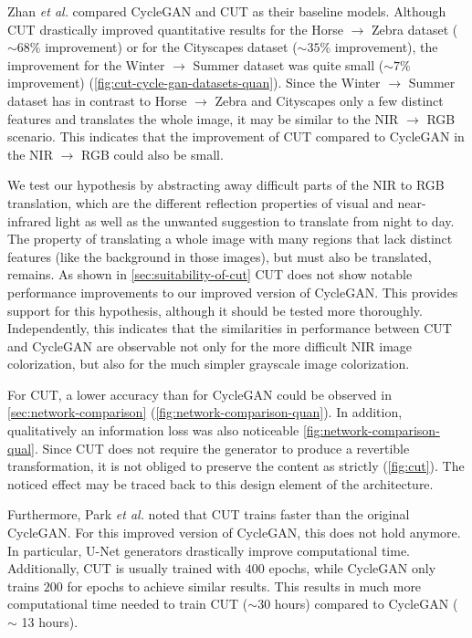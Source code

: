 \documentclass[a4paper,11pt, DIV=12]{scrartcl}
\begin{document}
Zhan \textit{et al.} compared CycleGAN and CUT as their baseline models. Although CUT drastically improved quantitative results for the Horse $\rightarrow$ Zebra dataset ($\sim68\%$ improvement) or for the Cityscapes dataset
($\sim 35\%$ improvement), the improvement for the Winter $\rightarrow$ Summer dataset was quite small ($\sim 7\%$ improvement) (\autoref{fig:cut-cycle-gan-datasets-quan})\cite{monce}.
Since the Winter $\rightarrow$ Summer dataset has in contrast to Horse $\rightarrow$ Zebra and Cityscapes only a few distinct features and translates the whole image, it may be similar to the NIR $\rightarrow$ RGB scenario.
This indicates that the improvement of CUT compared to CycleGAN in the NIR $\rightarrow$ RGB could also be small.

We test our hypothesis by abstracting away difficult parts of the NIR to RGB translation, which are the different reflection properties of visual and near-infrared light as well as the unwanted suggestion to translate from night to day.
The property of translating a whole image with many regions that lack distinct features (like the background in those images), but must also be translated, remains.
As shown in \autoref{sec:suitability-of-cut} CUT does not show notable performance improvements to our improved version of CycleGAN.
This provides support for this hypothesis, although it should be tested more thoroughly.
Independently, this indicates that the similarities in performance between CUT and CycleGAN are observable not only for the more difficult NIR image colorization, but also for the much simpler grayscale image colorization.

For CUT, a lower accuracy than for CycleGAN could be observed in \autoref{sec:network-comparison} (\autoref{fig:network-comparison-quan}).
In addition, qualitatively an information loss was also noticeable \autoref{fig:network-comparison-qual}.
Since CUT does not require the generator to produce a revertible transformation, it is not obliged to preserve the content as strictly (\autoref{fig:cut}).
The noticed effect may be traced back to this design element of the architecture.

Furthermore, Park \textit{et al.} noted that CUT trains faster than the original CycleGAN.
For this improved version of CycleGAN, this does not hold anymore.
In particular, U-Net generators drastically improve computational time.
Additionally, CUT is usually trained with $400$ epochs, while CycleGAN only trains $200$ for epochs to achieve similar results.
This results in much more computational time needed to train CUT ($\sim 30$ hours) compared to CycleGAN ($\sim$ 13 hours).
\end{document}
